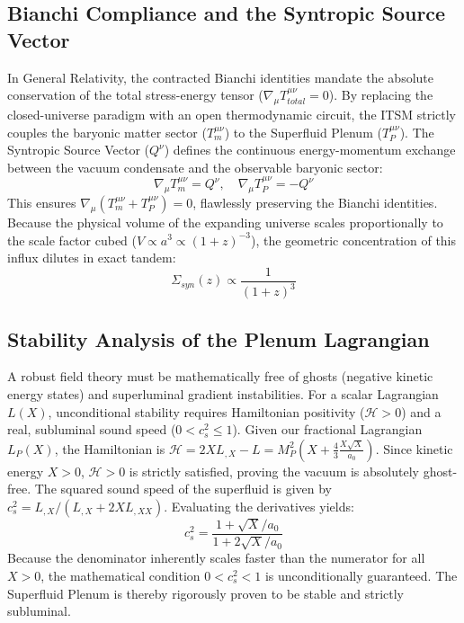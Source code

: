 \documentclass[aps,prd,onecolumn,linenumbers,superscriptaddress,nofootinbib]{revtex4-2}
\begin{document}
\subsection{Bianchi Compliance and the Syntropic Source Vector}
In General Relativity, the contracted Bianchi identities mandate the absolute conservation of the total stress-energy tensor ($\nabla_\mu T^{\mu\nu}_{total} = 0$). By replacing the closed-universe paradigm with an open thermodynamic circuit, the ITSM strictly couples the baryonic matter sector ($T_m^{\mu\nu}$) to the Superfluid Plenum ($T_P^{\mu\nu}$). The Syntropic Source Vector ($Q^\nu$) defines the continuous energy-momentum exchange between the vacuum condensate and the observable baryonic sector:
\begin{equation}
\nabla_\mu T_m^{\mu\nu} = Q^\nu, \quad \nabla_\mu T_P^{\mu\nu} = -Q^\nu
\end{equation}
This ensures $\nabla_\mu (T_m^{\mu\nu} + T_P^{\mu\nu}) = 0$, flawlessly preserving the Bianchi identities. Because the physical volume of the expanding universe scales proportionally to the scale factor cubed ($V \propto a^3 \propto (1+z)^{-3}$), the geometric concentration of this influx dilutes in exact tandem:
\begin{equation}
\Sigma_{syn}(z) \propto \frac{1}{(1+z)^3}
\end{equation}

\subsection{Stability Analysis of the Plenum Lagrangian}
A robust field theory must be mathematically free of ghosts (negative kinetic energy states) and superluminal gradient instabilities. For a scalar Lagrangian $L(X)$, unconditional stability requires Hamiltonian positivity ($\mathcal{H} > 0$) and a real, subluminal sound speed ($0 < c_s^2 \le 1$). Given our fractional Lagrangian $L_P(X)$, the Hamiltonian is $\mathcal{H} = 2X L_{,X} - L = M_P^2 \left(X + \frac{4}{3}\frac{X\sqrt{X}}{a_0}\right)$. Since kinetic energy $X > 0$, $\mathcal{H} > 0$ is strictly satisfied, proving the vacuum is absolutely ghost-free. The squared sound speed of the superfluid is given by $c_s^2 = L_{,X} / (L_{,X} + 2X L_{,XX})$. Evaluating the derivatives yields:
\begin{equation}
c_s^2 = \frac{1 + \sqrt{X}/a_0}{1 + 2\sqrt{X}/a_0}
\end{equation}
Because the denominator inherently scales faster than the numerator for all $X > 0$, the mathematical condition $0 < c_s^2 < 1$ is unconditionally guaranteed. The Superfluid Plenum is thereby rigorously proven to be stable and strictly subluminal.
\end{document}
